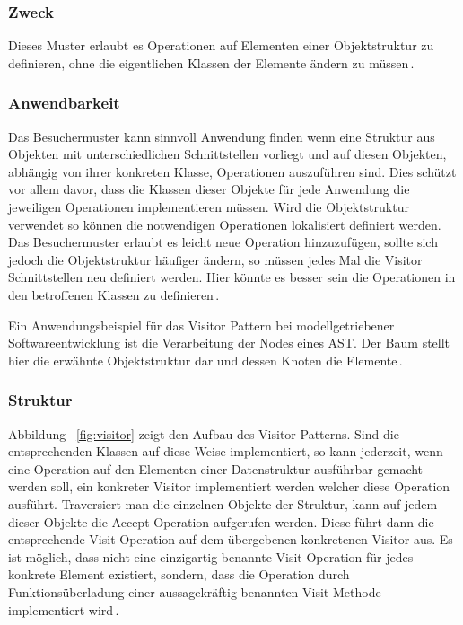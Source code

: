 \documentclass[12pt,oneside,a4paper,parskip]{scrbook}
\begin{document}
\subsubsection{Zweck}

Dieses Muster erlaubt es Operationen auf Elementen einer Objektstruktur zu definieren, ohne die eigentlichen Klassen der Elemente ändern zu müssen\,\cite[S. 480]{gamma2015}.

\subsubsection{Anwendbarkeit}

Das Besuchermuster kann sinnvoll Anwendung finden wenn eine Struktur aus Objekten mit unterschiedlichen Schnittstellen vorliegt und auf diesen Objekten, abhängig von ihrer konkreten Klasse, Operationen auszuführen sind. Dies schützt vor allem davor, dass die Klassen dieser Objekte für jede Anwendung die jeweiligen Operationen implementieren müssen. Wird die Objektstruktur verwendet so können die notwendigen Operationen lokalisiert definiert werden. Das Besuchermuster erlaubt es leicht neue Operation hinzuzufügen, sollte sich jedoch die Objektstruktur häufiger ändern, so müssen jedes Mal die Visitor Schnittstellen neu definiert werden. Hier könnte es besser sein die Operationen in den betroffenen Klassen zu definieren\,\cite[S. 484]{gamma2015}.

Ein Anwendungsbeispiel für das Visitor Pattern bei modellgetriebener Softwareentwicklung ist die Verarbeitung der Nodes eines AST. Der Baum stellt hier die erwähnte Objektstruktur dar und dessen Knoten die Elemente\,\cite[S. 480]{gamma2015}.

\subsubsection{Struktur}

Abbildung ~\ref{fig:visitor} zeigt den Aufbau des Visitor Patterns. Sind die entsprechenden Klassen auf diese Weise implementiert, so kann jederzeit, wenn eine Operation auf den Elementen einer Datenstruktur ausführbar gemacht werden soll, ein konkreter Visitor implementiert werden welcher diese Operation ausführt. Traversiert man die einzelnen Objekte der Struktur, kann auf jedem dieser Objekte die Accept-Operation aufgerufen werden. Diese führt dann die entsprechende Visit-Operation auf dem übergebenen konkretenen Visitor aus. Es ist möglich, dass nicht eine einzigartig benannte Visit-Operation für jedes konkrete Element existiert, sondern, dass die Operation durch Funktionsüberladung einer aussagekräftig benannten Visit-Methode implementiert wird\,\cite[S.485 ff.]{gamma2015}.
\end{document}
